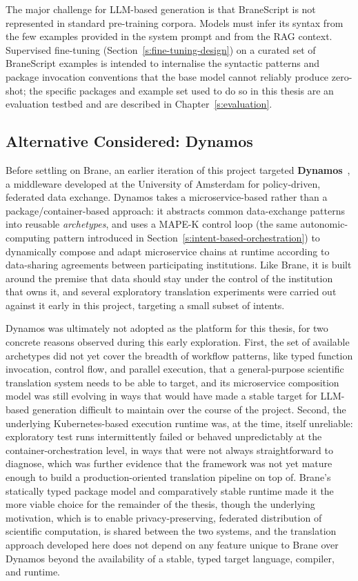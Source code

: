 The major challenge for LLM-based generation is that BraneScript is not
represented in standard pre-training corpora. Models must infer its syntax from
the few examples provided in the system prompt and from the RAG context.
Supervised fine-tuning (Section~\ref{s:fine-tuning-design}) on a curated set of BraneScript examples is
intended to internalise the syntactic patterns and package invocation conventions
that the base model cannot reliably produce zero-shot; the specific packages and
example set used to do so in this thesis are an evaluation testbed and are
described in Chapter~\ref{s:evaluation}.

\subsection{Alternative Considered: Dynamos}

Before settling on Brane, an earlier iteration of this project targeted
\textbf{Dynamos}~\cite{stutterheim2024dynamos,stutterheim2024thesis}, a
middleware developed at the University of Amsterdam for policy-driven,
federated data exchange. Dynamos takes a microservice-based rather than a
package/container-based approach: it abstracts common data-exchange patterns
into reusable \emph{archetypes}, and uses a MAPE-K control loop (the same
autonomic-computing pattern introduced in
Section~\ref{s:intent-based-orchestration}) to dynamically compose and adapt
microservice chains at runtime according to data-sharing agreements between
participating institutions. Like Brane, it is built around the premise that
data should stay under the control of the institution that owns it, and
several exploratory translation experiments were carried out against it early
in this project, targeting a small subset of intents.

Dynamos was ultimately not adopted as the platform for this thesis, for two
concrete reasons observed during this early exploration. First, the set of
available archetypes did not yet cover the breadth of workflow patterns, like
typed function invocation, control flow, and parallel execution, that a
general-purpose scientific translation system needs to be able to target, and
its microservice composition model was still evolving in ways that would have
made a stable target for LLM-based generation difficult to maintain over the
course of the project. Second, the underlying Kubernetes-based execution
runtime was, at the time, itself unreliable: exploratory test runs
intermittently failed or behaved unpredictably at the container-orchestration
level, in ways that were not always straightforward to diagnose, which was
further evidence that the framework was not yet mature enough to build a
production-oriented translation pipeline on top of. Brane's statically typed
package model and comparatively stable runtime made it the more viable
choice for the remainder of the thesis, though the underlying motivation, which is to enable
privacy-preserving, federated distribution of scientific computation, is
shared between the two systems, and the translation approach developed here
does not depend on any feature unique to Brane over Dynamos beyond the
availability of a stable, typed target language, compiler, and runtime.


